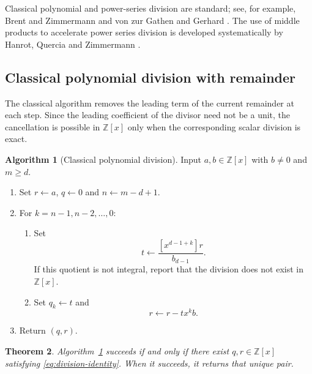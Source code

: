 \documentclass[11pt]{book}
\newtheorem{theorem}{Theorem}[section]
\theoremstyle{definition}
\newtheorem{algorithm}[theorem]{Algorithm}
\newcommand{\ZZ}{\mathbb Z}
\begin{document}
Classical polynomial and power-series division are standard; see, for example,
Brent and Zimmermann \cite{BrentZimmermann2010} and von zur Gathen and Gerhard
\cite{vonZurGathenGerhard2013}.  The use of middle products to accelerate power
series division is developed systematically by Hanrot, Quercia and Zimmermann
\cite{HanrotQuerciaZimmermann2004}.

\subsection{Classical polynomial division with remainder}

The classical algorithm removes the leading term of the current remainder at
each step.  Since the leading coefficient of the divisor need not be a unit,
the cancellation is possible in $\ZZ[x]$ only when the corresponding scalar
division is exact.

\begin{algorithm}[Classical polynomial division]\label{alg:division-classical}
Input $a,b\in\ZZ[x]$ with $b\ne0$ and $m\geq d$.
\begin{enumerate}
 \item Set $r\leftarrow a$, $q\leftarrow0$ and $n\leftarrow m-d+1$.
 \item For $k=n-1,n-2,\ldots,0$:
 \begin{enumerate}
  \item Set
  \[
   t\leftarrow \frac{[x^{d-1+k}]r}{b_{d-1}}.
  \]
  If this quotient is not integral, report that the division does not exist in
  $\ZZ[x]$.
  \item Set $q_k\leftarrow t$ and
  \[
   r\leftarrow r-tx^k b.
  \]
 \end{enumerate}
 \item Return $(q,r)$.
\end{enumerate}
\end{algorithm}

\begin{theorem}\label{thm:division-classical-correctness}
Algorithm~\ref{alg:division-classical} succeeds if and only if there exist
$q,r\in\ZZ[x]$ satisfying \eqref{eq:division-identity}.  When it succeeds, it
returns that unique pair.
\end{theorem}
\end{document}
